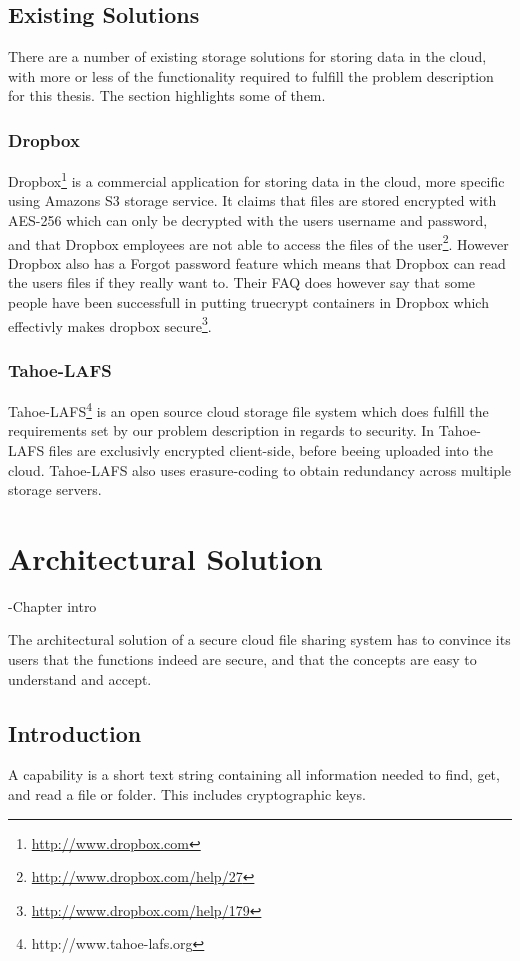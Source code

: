 \documentclass[english,12pt,a4paper]{book}
\begin{document}
\section{Existing Solutions}
There are a number of existing storage solutions for storing data in the cloud,
with more or less of the functionality required to fulfill the problem
description for this thesis. The section highlights some of them.

\subsection{Dropbox} Dropbox\footnote{\url{http://www.dropbox.com}} is a
commercial application for storing data in the cloud, more specific using
Amazons S3 storage service. It claims that files are stored encrypted with
\ac{AES}-256 which can only be decrypted with the users username and password,
and that Dropbox employees are not able to access the files of the
user\footnote{\url{http://www.dropbox.com/help/27}}. However Dropbox also has a
Forgot password feature which means that Dropbox can read the users files if
they really want to. Their \ac{FAQ} does however say that some people have been
successfull in putting truecrypt containers in Dropbox which effectivly makes
dropbox secure\footnote{\url{http://www.dropbox.com/help/179}}.

\subsection{Tahoe-LAFS}
Tahoe-\ac{LAFS}\footnote{http://www.tahoe-lafs.org} is an open source
cloud storage file system which does fulfill the requirements set by our
problem description in regards to security. In Tahoe-\ac{LAFS} files are
exclusivly encrypted client-side, before beeing uploaded into the cloud.
Tahoe-\ac{LAFS} also uses erasure-coding to obtain redundancy across multiple
storage servers.  

\chapter{Architectural Solution}
\label{chap:AS}
-Chapter intro

The architectural solution of a secure cloud file sharing system has to convince
its users that the functions indeed are secure, and that the concepts are easy
to understand and accept.

\section{Introduction}
A capability is a short text string containing all information needed to find,
get, and read a file or folder. This includes cryptographic keys.
\end{document}
